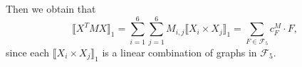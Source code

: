 \documentclass[12pt]{article}
\theoremstyle{definition}
\theoremstyle{remark}
\newcommand{\vc}[1]{\ensuremath{\vcenter{\hbox{#1}}}}
\def\outercycle#1#2{ \draw \foreach \x in {0,1,...,#1}{(270-45+\x*360/#2:0.5) coordinate(x\x)};}
\begin{document}
Then we obtain that
\[
\llbracket X^T M X \rrbracket_1 = \sum_{i=1}^6 \sum_{j=1}^6 M_{i,j} \llbracket X_i \times X_j \rrbracket_1 = \sum_{F \in \mathcal{F}_5} c_F^M \cdot F, 
\]
since each $\llbracket X_i \times X_j \rrbracket_1$ is a linear combination of graphs in $\mathcal{F}_5$.
\end{document}
